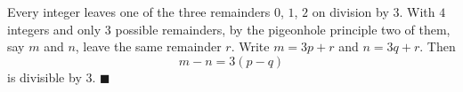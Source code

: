 Every integer leaves one of the three remainders $0$, $1$, $2$ on division by $3$. With $4$ integers and only $3$ possible remainders, by the pigeonhole principle two of them, say $m$ and $n$, leave the same remainder $r$. Write $m=3p+r$ and $n=3q+r$. Then
\[
m-n=3(p-q)
\]
is divisible by $3$. $\blacksquare$
